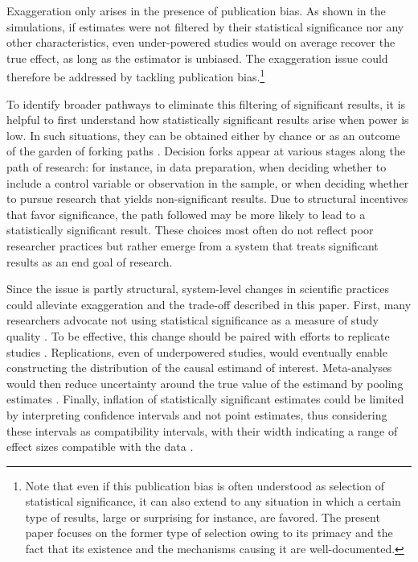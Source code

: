 \documentclass[usletter, 12pt]{article}
\begin{document}
			Exaggeration only arises in the presence of publication bias. As shown in the simulations, if estimates were not filtered by their statistical significance nor any other characteristics, even under-powered studies would on average recover the true effect, as long as the estimator is unbiased. The exaggeration issue could therefore be addressed by tackling publication bias.\footnote{Note that even if this publication bias is often understood as selection of statistical significance, it can also extend to any situation in which a certain type of results, large or surprising for instance, are favored. The present paper focuses on the former type of selection owing to its primacy and the fact that its existence and the mechanisms causing it are well-documented.}
			
			To identify broader pathways to eliminate this filtering of significant results, it is helpful to first understand how statistically significant results arise when power is low. In such situations, they can be obtained either by chance or as an outcome of the garden of forking paths \citep{simmons_falsepositive_2011, gelman_garden_2013, kasy_forking_2021}. Decision forks appear at various stages along the path of research: for instance, in data preparation, when deciding whether to include a control variable or observation in the sample, or when deciding whether to pursue research that yields non-significant results. Due to structural incentives that favor significance, the path followed may be more likely to lead to a statistically significant result. These choices most often do not reflect poor researcher practices but rather emerge from a system that treats significant results as an end goal of research. 
			
			Since the issue is partly structural, system-level changes in scientific practices could alleviate exaggeration and the trade-off described in this paper. First, many researchers advocate not using statistical significance as a measure of study quality \citep{mcshane_abandon_2019, abadie_statistical_2020}. To be effective, this change should be paired with efforts to replicate studies \citep{christensen_transparency_2018}. Replications, even of underpowered studies, would eventually enable constructing the distribution of the causal estimand of interest. Meta-analyses would then reduce uncertainty around the true value of the estimand by pooling estimates \citep{hernan_causal_2022}. Finally, inflation of statistically significant estimates could be limited by interpreting confidence intervals and not point estimates, thus considering these intervals as compatibility intervals, with their width indicating a range of effect sizes compatible with the data \citep{shadish_experimental_2002, amrhein_inferential_2019, romer_praise_2020}. 
			
\end{document}
